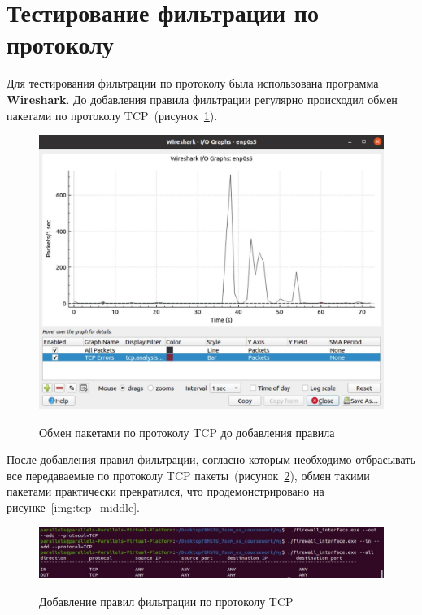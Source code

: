 \section{Тестирование фильтрации по протоколу}

Для тестирования фильтрации по протоколу была использована программа \textbf{Wireshark}. До добавления правила фильтрации регулярно происходил обмен пакетами по протоколу TCP~(рисунок~\ref{img:tcp_before}). 

\begin{figure}[h!]
	\begin{center}
		{\includegraphics[scale = 0.3]{inc/img/tcp_before.jpg}}
		\caption{Обмен пакетами по протоколу TCP до добавления правила}
		\label{img:tcp_before}
	\end{center}
\end{figure}

После добавления правил фильтрации, согласно которым необходимо отбрасывать все передаваемые по протоколу TCP пакеты~(рисунок~\ref{img:tcp_rule}), обмен такими пакетами практически прекратился, что продемонстрировано на рисунке~\ref{img:tcp_middle}.


\begin{figure}[h!]
	\begin{center}
		{\includegraphics[scale = 0.35]{inc/img/tcp_rule.jpg}}
		\caption{Добавление правил фильтрации по протоколу TCP}
		\label{img:tcp_rule}
	\end{center}
\end{figure}

